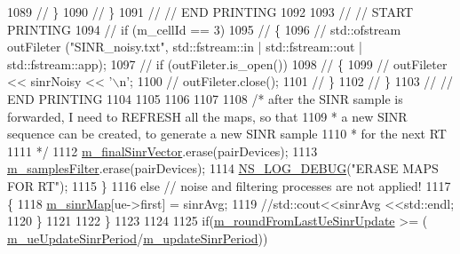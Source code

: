 \begin{DoxyCode}
1089                         \textcolor{comment}{//      \}}
1090                         \textcolor{comment}{// \}}
1091                         \textcolor{comment}{// // END PRINTING }
1092 
1093                         \textcolor{comment}{//              // START PRINTING}
1094                         \textcolor{comment}{// if (m\_cellId == 3)}
1095                         \textcolor{comment}{// \{}
1096                         \textcolor{comment}{//      std::ofstream outFileter ("SINR\_noisy.txt", std::fstream::in |
       std::fstream::out | std::fstream::app);}
1097                         \textcolor{comment}{//      if (outFileter.is\_open())}
1098                         \textcolor{comment}{//      \{}
1099                         \textcolor{comment}{//              outFileter << sinrNoisy << '\(\backslash\)n';}
1100                         \textcolor{comment}{//              outFileter.close();}
1101                         \textcolor{comment}{//      \}}
1102                         \textcolor{comment}{// \}}
1103                         \textcolor{comment}{// // END PRINTING }
1104                         
1105 
1106 
1107 
1108                         \textcolor{comment}{/* after the SINR sample is forwarded, I need to REFRESH all the maps, so that }
1109 \textcolor{comment}{                        * a new SINR sequence can be created, to generate a new SINR sample }
1110 \textcolor{comment}{                        * for the next RT}
1111 \textcolor{comment}{                        */}
1112                         \hyperlink{classns3_1_1MmWaveEnbPhy_a6c34c832c1bcb05fab00a4435cc499d0}{m\_finalSinrVector}.erase(pairDevices);
1113                         \hyperlink{classns3_1_1MmWaveEnbPhy_afee86fc55fdcef25ada2042be5740c62}{m\_samplesFilter}.erase(pairDevices);
1114                         \hyperlink{group__logging_ga413f1886406d49f59a6a0a89b77b4d0a}{NS\_LOG\_DEBUG}(\textcolor{stringliteral}{"ERASE MAPS FOR RT"});
1115                 \}
1116                 \textcolor{keywordflow}{else} \textcolor{comment}{// noise and filtering processes are not applied!}
1117                 \{
1118                         \hyperlink{classns3_1_1MmWaveEnbPhy_a754de7cf4bdbe107dfb006a5b332842a}{m\_sinrMap}[ue->first] = sinrAvg;
1119                         \textcolor{comment}{//std::cout<<sinrAvg <<std::endl;}
1120                 \}
1121 
1122         \}
1123 
1124 
1125         \textcolor{keywordflow}{if}(\hyperlink{classns3_1_1MmWaveEnbPhy_a708a523883e45c2b4d369b4367327fd8}{m\_roundFromLastUeSinrUpdate} >= (
      \hyperlink{classns3_1_1MmWaveEnbPhy_aba71f2faaa7e68f79e9156d37c6fed57}{m\_ueUpdateSinrPeriod}/\hyperlink{classns3_1_1MmWaveEnbPhy_af5b7224db4adb4c546e71ec42ce82703}{m\_updateSinrPeriod}))

\end{DoxyCode}

